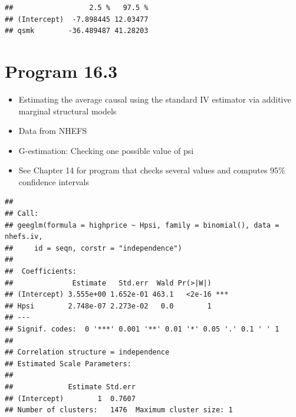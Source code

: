 \documentclass[
  10pt,
]{book}
\newenvironment{Shaded}{\begin{snugshade}}{\end{snugshade}}
\newcommand{\CommentTok}[1]{\textcolor[rgb]{0.56,0.35,0.01}{\textit{#1}}}
\newcommand{\DataTypeTok}[1]{\textcolor[rgb]{0.13,0.29,0.53}{#1}}
\newcommand{\DecValTok}[1]{\textcolor[rgb]{0.00,0.00,0.81}{#1}}
\newcommand{\FloatTok}[1]{\textcolor[rgb]{0.00,0.00,0.81}{#1}}
\newcommand{\KeywordTok}[1]{\textcolor[rgb]{0.13,0.29,0.53}{\textbf{#1}}}
\newcommand{\NormalTok}[1]{#1}
\newcommand{\OperatorTok}[1]{\textcolor[rgb]{0.81,0.36,0.00}{\textbf{#1}}}
\newcommand{\StringTok}[1]{\textcolor[rgb]{0.31,0.60,0.02}{#1}}
\providecommand{\tightlist}{%
  \setlength{\itemsep}{0pt}\setlength{\parskip}{0pt}}
\begin{document}
\begin{verbatim}
##                  2.5 %   97.5 %
## (Intercept)  -7.898445 12.03477
## qsmk        -36.489487 41.28203
\end{verbatim}

\hypertarget{program-16.3}{%
\section{Program 16.3}\label{program-16.3}}

\begin{itemize}
\tightlist
\item
  Estimating the average causal using the standard IV estimator via additive marginal structural models
\item
  Data from NHEFS
\item
  G-estimation: Checking one possible value of psi
\item
  See Chapter 14 for program that checks several values and computes 95\% confidence intervals
\end{itemize}

\begin{Shaded}
\end{Shaded}

\begin{verbatim}
## 
## Call:
## geeglm(formula = highprice ~ Hpsi, family = binomial(), data = nhefs.iv, 
##     id = seqn, corstr = "independence")
## 
##  Coefficients:
##              Estimate   Std.err  Wald Pr(>|W|)    
## (Intercept) 3.555e+00 1.652e-01 463.1   <2e-16 ***
## Hpsi        2.748e-07 2.273e-02   0.0        1    
## ---
## Signif. codes:  0 '***' 0.001 '**' 0.01 '*' 0.05 '.' 0.1 ' ' 1
## 
## Correlation structure = independence 
## Estimated Scale Parameters:
## 
##             Estimate Std.err
## (Intercept)        1  0.7607
## Number of clusters:   1476  Maximum cluster size: 1
\end{verbatim}
\end{document}
